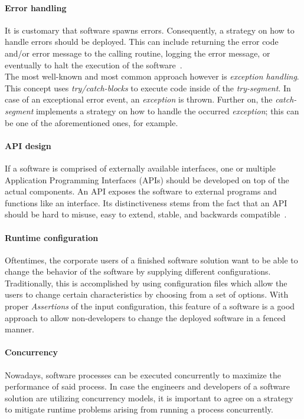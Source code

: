 \documentclass[12pt,a4paper]{report}
\begin{document}
\paragraph{Error handling}
It is customary that software spawns errors. Consequently, a strategy on how
to handle errors should be deployed. This can include returning the error code
and/or error message to the calling routine, logging the error message, or
eventually to halt the execution of the software~\cite{swebok}.\\
The most well-known and most common approach however is \textit{exception handling}.
This concept uses \textit{try/catch-blocks} to execute code inside of
the \textit{try-segment}. In case of an exceptional error event,
an \textit{exception} is thrown. Further on, the \textit{catch-segment}
implements a strategy on how to handle the occurred \textit{exception};
this can be one of the aforementioned ones, for example.

\paragraph{API design}
If a software is comprised of externally available interfaces,
one or multiple Application Programming Interfaces (APIs) should be developed
on top of the actual components. An API exposes the software to external programs
and functions like an interface. Its distinctiveness stems from the fact that
an API should be hard to misuse, easy to extend, stable, and backwards compatible~\cite{swebok}.

\paragraph{Runtime configuration}
Oftentimes, the corporate users of a finished software solution want to be able
to change the behavior of the software by supplying different configurations.
Traditionally, this is accomplished by using configuration files which allow
the users to change certain characteristics by choosing from a set of options.
With proper \textit{Assertions} of the input configuration, this feature of a
software is a good approach to allow non-developers to change the deployed software
in a fenced manner.

\paragraph{Concurrency}
Nowadays, software processes can be executed concurrently to maximize the performance
of said process. In case the engineers and developers of a software solution
are utilizing concurrency models, it is important to agree on a strategy to
mitigate runtime problems arising from running a process concurrently.
\end{document}
